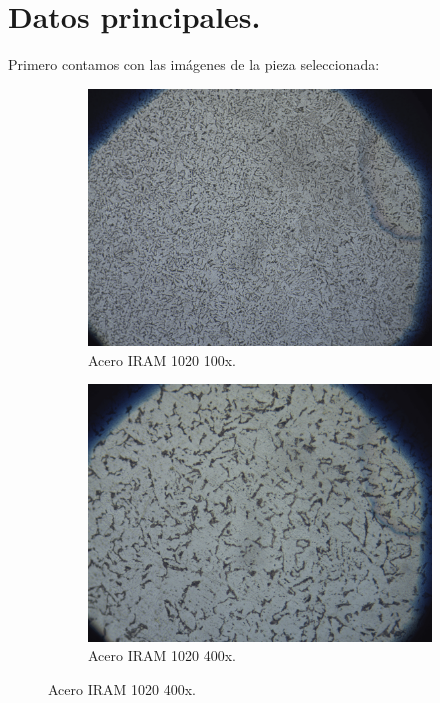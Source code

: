 \documentclass[12pt,a4paper]{article}
\begin{document}
\section{Datos principales.}
Primero contamos con las imágenes de la pieza seleccionada:
\begin{figure}[h]
    \centering
    \begin{subfigure}[b]{0.45\linewidth}
        \centering
        \includegraphics[width=\linewidth]{Figuras/Del-Rio_6.png}
        \caption{Acero IRAM 1020 100x.}
        \label{100x}
    \end{subfigure}
    \begin{subfigure}[b]{0.45\linewidth}
        \centering
        \includegraphics[width=\linewidth]{Figuras/Del-Rio_7.png}
        \caption{Acero IRAM 1020 400x.}
        \label{400x}
    \end{subfigure}


\end{figure}
\end{document}
